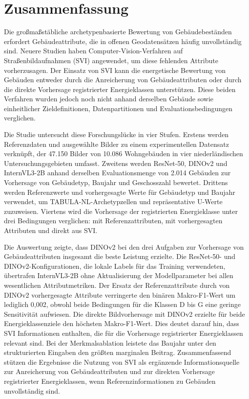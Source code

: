 \section*{Zusammenfassung}\par\noindent

Die großmaßstäbliche archetypenbasierte Bewertung von Gebäudebeständen erfordert Gebäudeattribute, die in offenen Geodatensätzen häufig unvollständig sind. Neuere Studien haben Computer-Vision-Verfahren auf Straßenbildaufnahmen (SVI) angewendet, um diese fehlenden Attribute vorherzusagen. Der Einsatz von SVI kann die energetische Bewertung von Gebäuden entweder durch die Anreicherung von Gebäudeattributen oder durch die direkte Vorhersage registrierter Energieklassen unterstützen. Diese beiden Verfahren wurden jedoch noch nicht anhand derselben Gebäude sowie einheitlicher Zieldefinitionen, Datenpartitionen und Evaluationsbedingungen verglichen.

Die Studie untersucht diese Forschungslücke in vier Stufen. Erstens werden Referenzdaten und ausgewählte Bilder zu einem experimentellen Datensatz verknüpft, der 47.150 Bilder von 10.086 Wohngebäuden in vier niederländischen Untersuchungsgebieten umfasst. Zweitens werden ResNet-50, DINOv2 und InternVL3-2B anhand derselben Evaluationsmenge von 2.014 Gebäuden zur Vorhersage von Gebäudetyp, Baujahr und Geschosszahl bewertet. Drittens werden Referenzwerte und vorhergesagte Werte für Gebäudetyp und Baujahr verwendet, um TABULA-NL-Archetypzellen und repräsentative U-Werte zuzuweisen. Viertens wird die Vorhersage der registrierten Energieklasse unter drei Bedingungen verglichen: mit Referenzattributen, mit vorhergesagten Attributen und direkt aus SVI.

Die Auswertung zeigte, dass DINOv2 bei den drei Aufgaben zur Vorhersage von Gebäudeattributen insgesamt die beste Leistung erzielte. Die ResNet-50- und DINOv2-Konfigurationen, die lokale Labels für das Training verwendeten, übertrafen InternVL3-2B ohne Aktualisierung der Modellparameter bei allen wesentlichen Attributmetriken. Der Ersatz der Referenzattribute durch von DINOv2 vorhergesagte Attribute verringerte den binären Makro-F1-Wert um lediglich 0,002, obwohl beide Bedingungen für die Klassen D bis G eine geringe Sensitivität aufwiesen. Die direkte Bildvorhersage mit DINOv2 erzielte für beide Energieklassenziele den höchsten Makro-F1-Wert. Dies deutet darauf hin, dass SVI Informationen enthalten, die für die Vorhersage registrierter Energieklassen relevant sind. Bei der Merkmalsablation leistete das Baujahr unter den strukturierten Eingaben den größten marginalen Beitrag. Zusammenfassend stützen die Ergebnisse die Nutzung von SVI als ergänzende Informationsquelle zur Anreicherung von Gebäudeattributen und zur direkten Vorhersage registrierter Energieklassen, wenn Referenzinformationen zu Gebäuden unvollständig sind.
